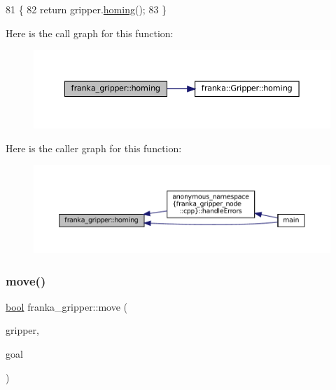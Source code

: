 \begin{DoxyCode}
81                                                                        \{
82   \textcolor{keywordflow}{return} gripper.\hyperlink{classfranka_1_1Gripper_aef356f93a4c3b9d6b2532c29126d478c}{homing}();
83 \}
\end{DoxyCode}
Here is the call graph for this function\+:
\nopagebreak
\begin{figure}[H]
\begin{center}
\leavevmode
\includegraphics[width=350pt]{namespacefranka__gripper_a098e502a3ba4aed6147ec76f1421e803_cgraph}
\end{center}
\end{figure}
Here is the caller graph for this function\+:
\nopagebreak
\begin{figure}[H]
\begin{center}
\leavevmode
\includegraphics[width=350pt]{namespacefranka__gripper_a098e502a3ba4aed6147ec76f1421e803_icgraph}
\end{center}
\end{figure}
\mbox{\label{namespacefranka__gripper_a1356a87108d2229401d3755bd3e53bdf}} 
\subsubsection{\texorpdfstring{move()}{move()}}
{\footnotesize\ttfamily \hyperlink{classbool}{bool} franka\+\_\+gripper\+::move (\begin{DoxyParamCaption}\item[{const \hyperlink{classfranka_1_1Gripper}{franka\+::\+Gripper} \&}]{gripper,  }\item[{const Move\+Goal\+Const\+Ptr \&}]{goal }\end{DoxyParamCaption})}

